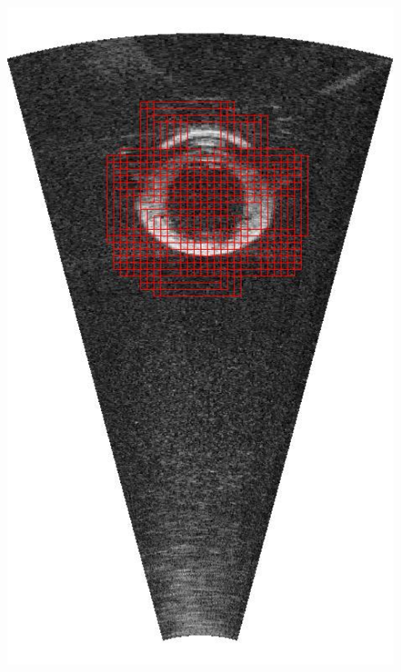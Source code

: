 \begin{figure}[!t]
{		\includegraphics[height=0.2\textheight]{chapters/images/proposals/unseen/detections-large-tire.jpg}
}
\end{figure}
